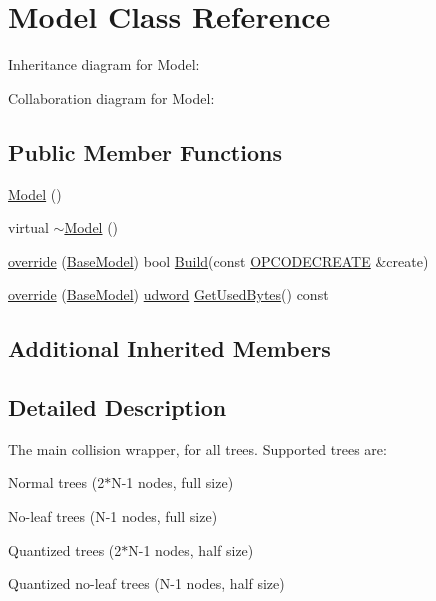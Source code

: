 \hypertarget{class_model}{\section{Model Class Reference}
\label{class_model}
}


Inheritance diagram for Model\+:


Collaboration diagram for Model\+:
\subsection*{Public Member Functions}
\begin{DoxyCompactItemize}
\item 
\hyperlink{class_model_ae3b375de5f6df4faf74a95d64748e048}{Model} ()
\item 
virtual \hyperlink{class_model_ad6ebd2062a0b823db841a0b88baac4c0}{$\sim$\+Model} ()
\item 
\hyperlink{class_model_a89b90791569d00d04d75ef6ad3aba336}{override} (\hyperlink{class_base_model}{Base\+Model}) bool \hyperlink{class_base_model_ab2692ac2ec9c0c8c452d73f3a0bd341b}{Build}(const \hyperlink{struct_o_p_c_o_d_e_c_r_e_a_t_e}{O\+P\+C\+O\+D\+E\+C\+R\+E\+A\+T\+E} \&create)
\item 
\hyperlink{class_model_a044b13eee3f98b4417597bd657ab4911}{override} (\hyperlink{class_base_model}{Base\+Model}) \hyperlink{_ice_types_8h_a44c6f1920ba5551225fb534f9d1a1733}{udword} \hyperlink{class_base_model_a714251e9cd861e4e304f5740c75a5b74}{Get\+Used\+Bytes}() const 
\end{DoxyCompactItemize}
\subsection*{Additional Inherited Members}


\subsection{Detailed Description}
The main collision wrapper, for all trees. Supported trees are\+:
\begin{DoxyItemize}
\item Normal trees (2$\ast$\+N-\/1 nodes, full size)
\item No-\/leaf trees (N-\/1 nodes, full size)
\item Quantized trees (2$\ast$\+N-\/1 nodes, half size)
\item Quantized no-\/leaf trees (N-\/1 nodes, half size)
\end{DoxyItemize}

